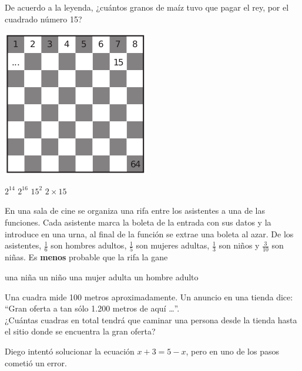 \documentclass[10pt,letterpaper,addpoints]{exam}
\begin{document}
\begin{questions}
\begin{minipage}{.5\textwidth}
De acuerdo a la leyenda, ¿cuántos granos de maíz tuvo que pagar el rey, por el cuadrado número 15?
\end{minipage}\hfill
\begin{minipage}{.5\textwidth}
\begin{center}
\includegraphics[scale=.55]{Images/ajedrez.png} 
\end{center}
\end{minipage}

\begin{oneparchoices}
\CorrectChoice $2^{14}$
\choice $2^{16}$
\choice $15^{2}$
\choice $2\times 15$
\end{oneparchoices}
\question En una sala de cine se organiza una rifa entre los asistentes a una de las funciones. Cada asistente marca la boleta de la entrada con sus datos y la introduce en una urna, al final de la función se extrae una boleta al azar. De los asistentes, $\frac{1}{6}$ son hombres adultos, $\frac{1}{5}$ son mujeres adultas, $\frac{1}{3}$ son niños y  $\frac{3}{10}$     son niñas. Es \textbf{menos} probable que la rifa la gane

\begin{oneparchoices}
\choice una niña
\choice un niño
\choice una mujer adulta
\CorrectChoice un hombre adulto
\end{oneparchoices}
\question Una cuadra mide 100 metros aproximadamente. Un anuncio en una tienda dice: “Gran oferta a tan sólo 1.200 metros de aquí \ldots ”.\\ 

¿Cuántas cuadras en total tendrá que caminar una persona desde la tienda hasta el sitio donde se encuentra la gran oferta?

\begin{oneparchoices}
\end{oneparchoices}
\question Diego intentó solucionar la ecuación $x + 3 = 5 - x$, pero en uno de los pasos cometió un error.


\end{questions}
\end{document}
